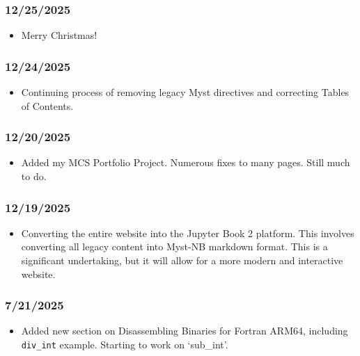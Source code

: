 \subsubsection{12/25/2025}

\begin{itemize}
\item Merry Christmas!
\end{itemize}

\subsubsection{12/24/2025}

\begin{itemize}
\item Continuing process of removing legacy Myst directives and correcting Tables of Contents.
\end{itemize}

\subsubsection{12/20/2025}

\begin{itemize}
\item Added my MCS Portfolio Project.  Numerous fixes to many pages.  Still much to do.
\end{itemize}

\subsubsection{12/19/2025}

\begin{itemize}
\item Converting the entire website into the Jupyter Book 2 platform.  This involves converting all legacy content into Myst-NB markdown format.  This is a significant undertaking, but it will allow for a more modern and interactive website.
\end{itemize}

\subsubsection{7/21/2025}

\begin{itemize}
\item Added new section on Disassembling Binaries for Fortran ARM64, including \texttt{div\_int} example.  Starting to work on `sub\_int'.
\end{itemize}

